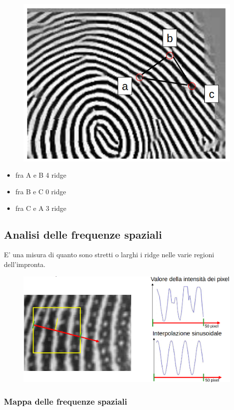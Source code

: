\begin{figure}[ht]
    \centering
    \includegraphics[width=0.5\linewidth]{chapters/images-chap6/ridge-counting.png}
\end{figure}

\begin{itemize}
    \item fra A e B 4 ridge
    \item fra B e C 0 ridge
    \item fra C e A 3 ridge
\end{itemize}

\subsection{Analisi delle frequenze spaziali}

E’ una misura di quanto sono stretti o larghi i
ridge nelle varie regioni dell’impronta.

\begin{figure}[ht]
    \centering
    \includegraphics[width=1\linewidth]{chapters/images-chap6/ridge-freq.png}
\end{figure}

\subsubsection{Mappa delle frequenze spaziali}

